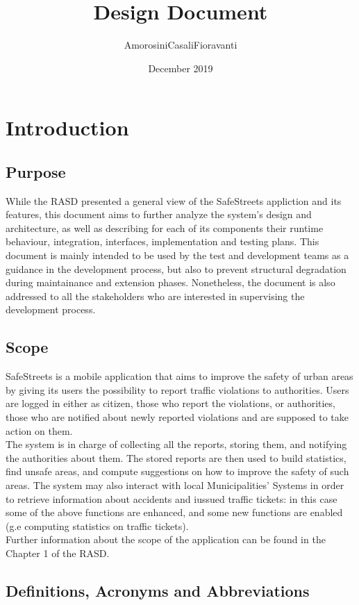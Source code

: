 \documentclass{report}
\title{Design Document}
\author{AmorosiniCasaliFioravanti}
\date{December 2019}
\begin{document}


\tableofcontents

\chapter{Introduction}
\section{Purpose}
While the RASD presented a general view of the SafeStreets appliction and its features, this document aims to further analyze the system's design and architecture, as well as describing for each of its components their runtime behaviour, integration, interfaces, implementation and testing plans.
This document is mainly intended to be used by the test and development teams as a guidance in the development process, but also to prevent structural degradation during maintainance and extension phases. Nonetheless, the document is also addressed to all the stakeholders who are interested in supervising the development process.

\section{Scope}
SafeStreets is a mobile application that aims to improve the safety of urban areas by giving its users the possibility to report traffic violations to authorities. Users are logged in either as citizen, those who report the violations, or authorities, those who are notified about newly reported violations and are supposed to take action on them.\\
The system is in charge of collecting all the reports, storing them, and notifying the authorities about them. The stored reports are then used to build statistics, find unsafe areas, and compute suggestions on how to improve the safety of such areas. The system may also interact with local Municipalities' Systems in order to retrieve information about accidents and iussued traffic tickets: in this case some of the above functions are enhanced, and some new functions are enabled (g.e computing statistics on traffic tickets).\\
\newline
Further information about the scope of the application can be found in the Chapter 1 of the RASD.

\section{Definitions, Acronyms and Abbreviations}
\end{document}
